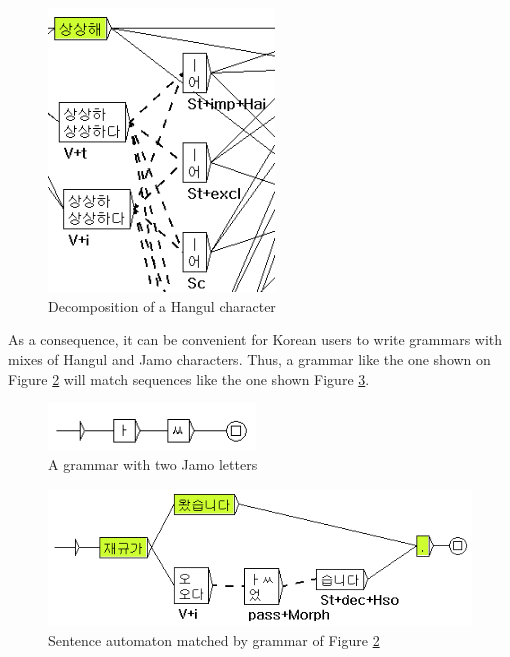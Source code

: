 \begin{figure}[!ht]
\begin{center}
\includegraphics[width=6cm]{resources/img/fig7-korean2.png}
\caption{Decomposition of a Hangul character\label{fig7-korean2}}
\end{center}
\end{figure}

\noindent As a consequence, it can be convenient for Korean users to write
grammars with mixes of Hangul and Jamo characters. Thus, a grammar like the one shown on
Figure \ref{fig7-korean3} will match sequences like the one shown Figure 
\ref{fig7-korean4}.

\begin{figure}[!ht]
\begin{center}
\includegraphics[width=5.5cm]{resources/img/fig7-korean3.png}
\caption{A grammar with two Jamo letters\label{fig7-korean3}}
\end{center}
\end{figure}

\begin{figure}[!ht]
\begin{center}
\includegraphics[width=13cm]{resources/img/fig7-korean4.png}
\caption{Sentence automaton matched by grammar of
Figure \ref{fig7-korean3}\label{fig7-korean4}}
\end{center}
\end{figure}

